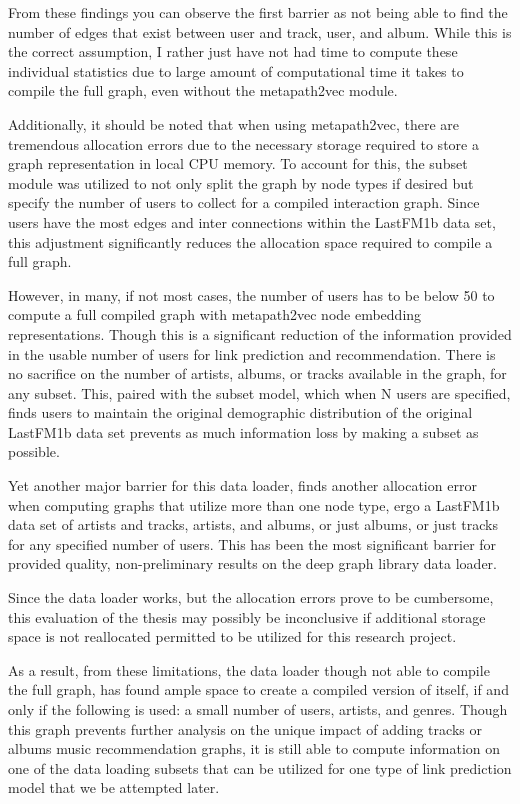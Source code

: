From these findings you can observe the first barrier as not being able to find the number of edges that exist between user and track, user, and album. While this is the correct assumption, I rather just have not had time to compute these individual statistics due to large amount of computational time it takes to compile the full graph, even without the metapath2vec module.

Additionally, it should be noted that when using metapath2vec, there are tremendous allocation errors due to the necessary storage required to store a graph representation in local CPU memory. To account for this, the subset module was utilized to not only split the graph by node types if desired but specify the number of users to collect for a compiled interaction graph. Since users have the most edges and inter connections within the LastFM1b data set, this adjustment significantly reduces the allocation space required to compile a full graph.

However, in many, if not most cases, the number of users has to be below 50 to compute a full compiled graph with metapath2vec node embedding representations. Though this is a significant reduction of the information provided in the usable number of users for link prediction and recommendation. There is no sacrifice on the number of artists, albums, or tracks available in the graph, for any subset. This, paired with the subset model, which when N users are specified, finds users to maintain the original demographic distribution of the original LastFM1b data set prevents as much information loss by making a subset as possible.

Yet another major barrier for this data loader, finds another allocation error when computing graphs that utilize more than one node type, ergo a LastFM1b data set of artists and tracks, artists, and albums, or just albums, or just tracks for any specified number of users. This has been the most significant
barrier for provided quality, non-preliminary results on the deep graph library data loader.

Since the data loader works, but the allocation errors prove to be cumbersome, this evaluation of the thesis may possibly be inconclusive if additional storage space is not reallocated permitted to be utilized for this research project.

As a result, from these limitations, the data loader though not able to compile the full graph, has found ample space to create a compiled version of itself, if and only if the following is used: a small number of users, artists, and genres. Though this graph prevents further analysis on the unique impact of adding tracks or albums music recommendation graphs, it is still able to compute information on one of the data loading subsets that can be utilized for one type of link prediction model that we be attempted later.


